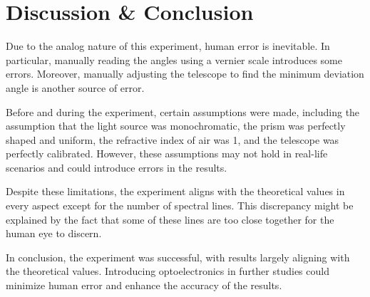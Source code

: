 \documentclass[10pt]{article}
\begin{document}
\FloatBarrier %
 
\section{Discussion \& Conclusion}

Due to the analog nature of this experiment, human error is inevitable. In particular, manually reading the angles using a vernier scale introduces some errors. Moreover, manually adjusting the telescope to find the minimum deviation angle is another source of error.

Before and during the experiment, certain assumptions were made, including the assumption that the light source was monochromatic, the prism was perfectly shaped and uniform, the refractive index of air was 1, and the telescope was perfectly calibrated. However, these assumptions may not hold in real-life scenarios and could introduce errors in the results.

Despite these limitations, the experiment aligns with the theoretical values in every aspect except for the number of spectral lines. This discrepancy might be explained by the fact that some of these lines are too close together for the human eye to discern.

In conclusion, the experiment was successful, with results largely aligning with the theoretical values. Introducing optoelectronics in further studies could minimize human error and enhance the accuracy of the results.

\printbibliography
\end{document}
